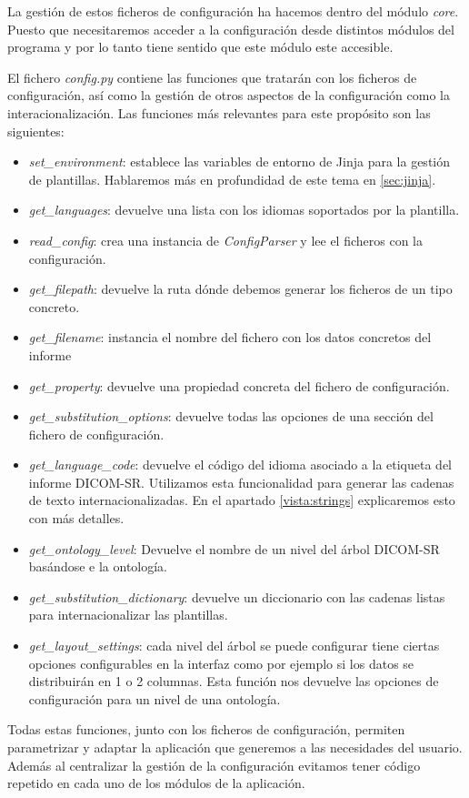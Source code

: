La gestión de estos ficheros de configuración ha hacemos dentro del módulo \emph{core}. Puesto que necesitaremos acceder a la configuración desde distintos módulos del programa y por lo tanto tiene sentido que este módulo este accesible.\par
El fichero \emph{config.py} contiene las funciones que tratarán con los ficheros de configuración, así como la gestión de otros aspectos de la configuración como la interacionalización. Las funciones más relevantes para este propósito son las siguientes:
\begin{itemize}
\item \emph{set\_environment}: establece las variables de entorno de Jinja para la gestión de plantillas. Hablaremos más en profundidad de este tema en \ref{sec:jinja}.
\item \emph{get\_languages}: devuelve una lista con los idiomas soportados por la plantilla.
\item \emph{read\_config}: crea una instancia de \emph{ConfigParser} y lee el ficheros con la configuración.
\item \emph{get\_filepath}: devuelve la ruta dónde debemos generar los ficheros de un tipo concreto.
\item \emph{get\_filename}: instancia el nombre del fichero con los datos concretos del informe
\item \emph{get\_property}: devuelve una propiedad concreta del fichero de configuración. 
\item \emph{get\_substitution\_options}: devuelve todas las opciones de una sección del fichero de configuración.
\item \emph{get\_language\_code}: devuelve el código del idioma asociado a la etiqueta del informe DICOM-SR. Utilizamos esta funcionalidad para generar las cadenas de texto internacionalizadas. En el apartado \ref{vista:strings} explicaremos esto con más detalles.
\item \emph{get\_ontology\_level}: Devuelve el nombre de un nivel del árbol DICOM-SR basándose e la ontología.
\item \emph{get\_substitution\_dictionary}: devuelve un diccionario con las cadenas listas para internacionalizar las plantillas. 
\item \emph{get\_layout\_settings}: cada nivel del árbol se puede configurar tiene ciertas opciones configurables en la interfaz como por ejemplo si los datos se distribuirán en 1 o 2 columnas. Esta función nos devuelve las opciones de configuración para un nivel de una ontología.
\end{itemize}
Todas estas funciones, junto con los ficheros de configuración, permiten parametrizar y adaptar la aplicación que generemos a las necesidades del usuario. Además al centralizar la gestión de la configuración evitamos tener código repetido en cada uno de los módulos de la aplicación.\par

